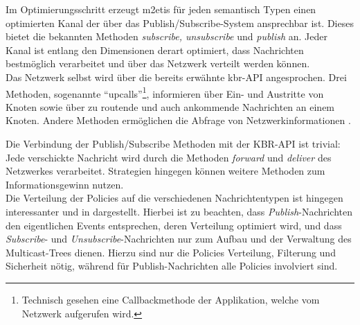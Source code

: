 Im Optimierungsschritt erzeugt \ac{m2etis} für jeden semantisch Typen einen optimierten Kanal der über das Publish/Subscribe-System ansprechbar ist. Dieses bietet die bekannten Methoden \emph{subscribe, unsubscribe} und \emph{publish} an. Jeder Kanal ist entlang den Dimensionen derart optimiert, dass Nachrichten bestmöglich verarbeitet und über das Netzwerk verteilt werden können.\\
Das Netzwerk selbst wird über die bereits erwähnte \ac{kbr}-API angesprochen. Drei Methoden, sogenannte ``upcalls''\footnote{Technisch gesehen eine Callbackmethode der Applikation, welche vom Netzwerk aufgerufen wird.},  informieren über Ein- und Austritte von Knoten sowie über zu routende und auch ankommende Nachrichten an einem Knoten. Andere Methoden ermöglichen die Abfrage von Netzwerkinformationen \cite{Dabek2003Towards}.

Die Verbindung der Publish/Subscribe Methoden mit der KBR-API ist trivial: Jede verschickte Nachricht wird durch die Methoden \emph{forward} und \emph{deliver} des Netzwerkes verarbeitet. Strategien hingegen können weitere Methoden zum Informationsgewinn nutzen.\\
Die Verteilung der Policies auf die verschiedenen Nachrichtentypen ist hingegen interessanter und in  dargestellt. Hierbei ist zu beachten, dass \emph{Publish}-Nachrichten den eigentlichen Events entsprechen, deren Verteilung optimiert wird, und dass \emph{Subscribe}- und \emph{Unsubscribe}-Nachrichten nur zum Aufbau und der Verwaltung des Multicast-Trees dienen. Hierzu sind nur die Policies Verteilung, Filterung und Sicherheit nötig, während für Publish-Nachrichten alle Policies involviert sind.

\begin{table}[!h]
\caption{Verbindungsmatrix}
\label{tab:verbindungsmatrix}
\end{table}

